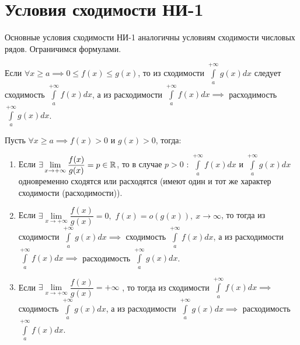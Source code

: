 \documentclass[../../main.tex]{subfiles}
\begin{document}
\section{Условия сходимости НИ-1}
Основные условия сходимости НИ-1 аналогичны условиям сходимости числовых рядов.
Ограничимся формулами.
\begin{thm}
Если $\forall x \geq a \implies 0 \leq f(x) \leq g(x)$, то из
сходимости $\int\limits_a^{+\infty} g(x)dx$ следует сходимость
$\int\limits_a^{+\infty} f(x)dx$, а из расходимости
$\int\limits_a^{+\infty} f(x)dx \implies$
расходимость $\int\limits_a^{+\infty} g(x)dx$.
\end{thm}
\begin{thm}
Пусть $\forall x \geq a \implies f(x) > 0$ и $g(x) > 0$, тогда:
\begin{enumerate}
    \item Если $\exists \lim\limits_{x \to +\infty} \dfrac{f(x)}{g(x)} = p
    \in \mathbb{R}$, то в случае $p > 0$ :
    $\int\limits_a^{+\infty} f(x)dx$ и $\int\limits_a^{+\infty} g(x)dx $
    одновременно сходятся или расходятся (имеют один и тот же характер
    сходимости (расходимости)).
    \item Если $\exists \lim\limits_{x \to +\infty} \dfrac{f(x)}{g(x)} = 0,$
    $f(x) = o(g(x)), \ x \to \infty$, то тогда из сходимости
    $\int\limits_a^{+\infty} g(x)dx \implies$ сходимость
    $\int\limits_a^{+\infty} f(x)dx$, а из расходимости
    $\int\limits_a^{+\infty} f(x)dx \implies$ расходимость
    $\int\limits_a^{+\infty} g(x)dx$.
    \item Если $\exists \lim\limits_{x \to +\infty}
    \dfrac{f(x)}{g(x)} = +\infty$
    , то тогда из сходимости
    $\int\limits_a^{+\infty} f(x)dx \implies$ сходимость
    $\int\limits_a^{+\infty} g(x)dx$, а из расходимости
    $\int\limits_a^{+\infty} g(x)dx \implies$ расходимость
    $\int\limits_a^{+\infty} f(x)dx$.
\end{enumerate}
\end{thm}

\begin{crl*}
\end{crl*}
\end{document}
